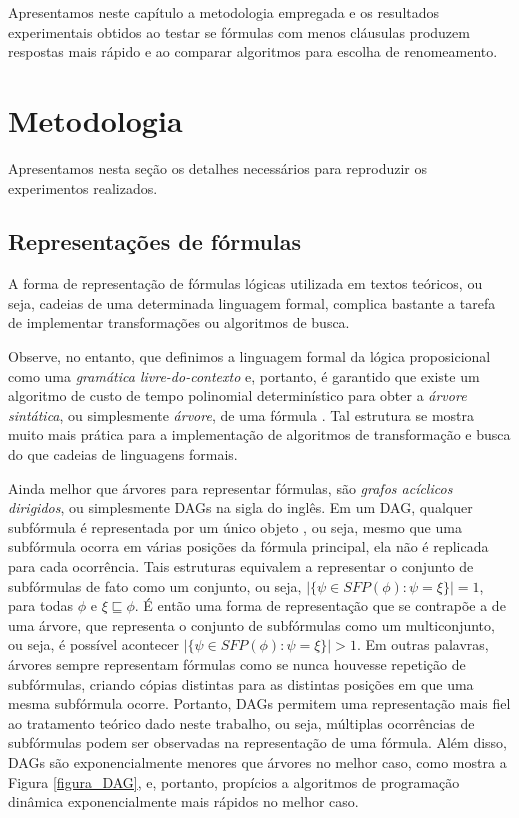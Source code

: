 
\label{cap_resultados}

\indent

Apresentamos neste capítulo a metodologia empregada e os resultados experimentais obtidos ao testar se fórmulas com menos cláusulas produzem respostas mais rápido e ao comparar algoritmos para escolha de renomeamento.

\section{Metodologia}

\indent

Apresentamos nesta seção os detalhes necessários para reproduzir os experimentos realizados.

\subsection{Representações de fórmulas}

\indent

A forma de representação de fórmulas lógicas utilizada em textos teóricos, ou seja, cadeias de uma determinada linguagem formal, complica bastante a tarefa de implementar transformações ou algoritmos de busca.

Observe, no entanto, que definimos a linguagem formal da lógica proposicional como uma \emph{gramática livre-do-contexto} \cite{sipser2012introduction} e, portanto, é garantido que existe um algoritmo de custo de tempo polinomial determinístico para obter a \emph{árvore sintática}, ou simplesmente \emph{árvore}, de uma fórmula \cite{younger1967recognition}. Tal estrutura se mostra muito mais prática para a implementação de algoritmos de transformação e busca do que cadeias de linguagens formais.

Ainda melhor que árvores para representar fórmulas, são \emph{grafos acíclicos dirigidos}, ou simplesmente DAGs na sigla do inglês. Em um DAG, qualquer subfórmula é representada por um único objeto \cite{jackson2004clause}, ou seja, mesmo que uma subfórmula ocorra em várias posições da fórmula principal, ela não é replicada para cada ocorrência. Tais estruturas equivalem a representar o conjunto de subfórmulas de fato como um conjunto, ou seja, $|\{\psi \in SFP(\phi) : \psi = \xi \}| = 1$, para todas $\phi$ e $\xi \sqsubseteq \phi$. É então uma forma de representação que se contrapõe a de uma árvore, que representa o conjunto de subfórmulas como um multiconjunto, ou seja, é possível acontecer $|\{\psi \in SFP(\phi) : \psi = \xi \}| > 1$. Em outras palavras, árvores sempre representam fórmulas como se nunca houvesse repetição de subfórmulas, criando cópias distintas para as distintas posições em que uma mesma subfórmula ocorre. Portanto, DAGs permitem uma representação mais fiel ao tratamento teórico dado neste trabalho, ou seja, múltiplas ocorrências de subfórmulas podem ser observadas na representação de uma fórmula. Além disso, DAGs são exponencialmente menores que árvores no melhor caso, como mostra a Figura \ref{figura_DAG}, e, portanto, propícios a algoritmos de programação dinâmica \cite{bellman2015applied} exponencialmente mais rápidos no melhor caso.

